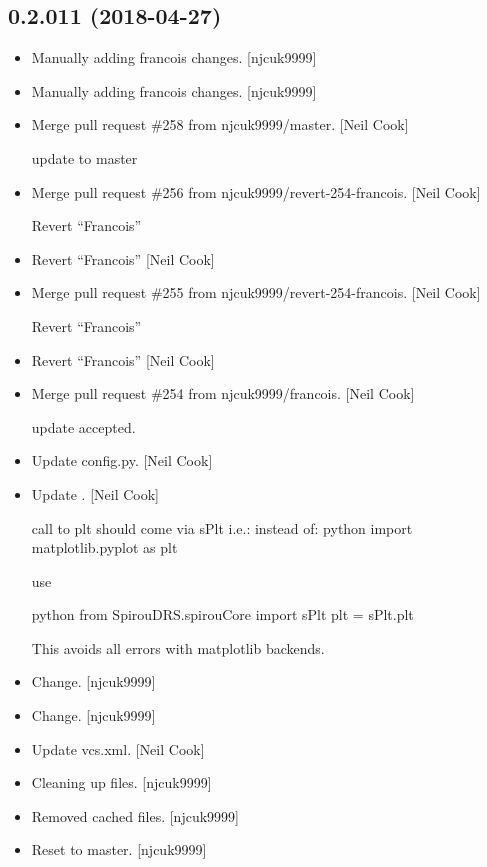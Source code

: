 \documentclass[a4paper,10pt,english]{report}
\begin{document}
\subsection{0.2.011 (2018-04-27)}
\label{\detokenize{misc/changelog:id451}}\begin{itemize}
\item {} 
Manually adding francois changes. {[}njcuk9999{]}

\item {} 
Manually adding francois changes. {[}njcuk9999{]}

\item {} 
Merge pull request \#258 from njcuk9999/master. {[}Neil Cook{]}

update to master

\item {} 
Merge pull request \#256 from njcuk9999/revert-254-francois. {[}Neil
Cook{]}

Revert “Francois”

\item {} 
Revert “Francois” {[}Neil Cook{]}

\item {} 
Merge pull request \#255 from njcuk9999/revert-254-francois. {[}Neil
Cook{]}

Revert “Francois”

\item {} 
Revert “Francois” {[}Neil Cook{]}

\item {} 
Merge pull request \#254 from njcuk9999/francois. {[}Neil Cook{]}

update accepted.

\item {} 
Update config.py. {[}Neil Cook{]}

\item {} 
Update . {[}Neil Cook{]}

call to plt should come via sPlt i.e.:
instead of:
python
import matplotlib.pyplot as plt

use

python
from SpirouDRS.spirouCore import sPlt
plt = sPlt.plt

This avoids all errors with matplotlib backends.

\item {} 
Change. {[}njcuk9999{]}

\item {} 
Change. {[}njcuk9999{]}

\item {} 
Update vcs.xml. {[}Neil Cook{]}

\item {} 
Cleaning up files. {[}njcuk9999{]}

\item {} 
Removed cached files. {[}njcuk9999{]}

\item {} 
Reset to master. {[}njcuk9999{]}

\end{itemize}
\end{document}
